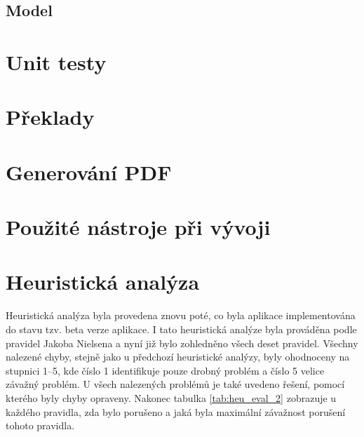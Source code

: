 \documentclass[thesis=M,czech]{FITthesis}[2012/06/26]
\begin{document}
	\subsection{Model}

\section{Unit testy}

\section{Překlady}

\section{Generování PDF}

\section{Použité nástroje při vývoji}

\section{Heuristická analýza}
Heuristická analýza byla provedena znovu poté, co byla aplikace implementována do stavu tzv. beta verze aplikace. I tato heuristická analýze byla prováděna podle pravidel Jakoba Nielsena a nyní již bylo zohledněno všech deset pravidel. Všechny nalezené chyby, stejně jako u předchozí heuristické analýzy, byly ohodnoceny na stupnici 1--5, kde číslo 1 identifikuje pouze drobný problém a číslo 5 velice závažný problém. U všech nalezených problémů je také uvedeno řešení, pomocí kterého byly chyby opraveny. Nakonec tabulka \ref{tab:heu_eval_2} zobrazuje u každého pravidla, zda bylo porušeno a jaká byla maximální závažnost porušení tohoto pravidla.
\end{document}
